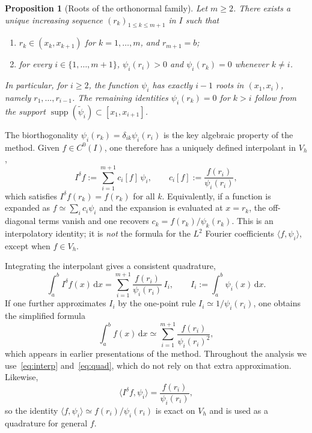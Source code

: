 \documentclass[final,3p,times]{elsarticle}
\theoremstyle{plain}
\newtheorem{proposition}[theorem]{Proposition}
\theoremstyle{definition}
\theoremstyle{remark}
\newcommand{\supp}{\operatorname{supp}}
\newcommand{\dd}{\mathrm{d}}
\begin{document}
\begin{proposition}[Roots of the orthonormal family]
\label{prop:roots}
Let $m\ge 2$. There exists a unique increasing sequence
$(r_k)_{1\le k\le m+1}$ in $I$ such that
\begin{enumerate}
\item $r_k\in(x_k,x_{k+1})$ for $k=1,\dots,m$, and $r_{m+1}=b$;
\item for every $i\in\{1,\dots,m+1\}$,
$\psi_i(r_i)>0$ and $\psi_i(r_k)=0$ whenever $k\neq i$.
\end{enumerate}
In particular, for $i\ge 2$, the function $\psi_i$ has exactly $i-1$ roots in
$(x_1,x_i)$, namely $r_1,\dots,r_{i-1}$. The remaining identities
$\psi_i(r_k)=0$ for $k>i$ follow from the support
$\supp(\widetilde\psi_i)\subset[x_1,x_{i+1}]$.
\end{proposition}

The biorthogonality $\psi_i(r_k)=\delta_{ik}\psi_i(r_i)$ is the key algebraic
property of the method. Given $f\in C^0(I)$, one therefore has a uniquely
defined interpolant in $V_h$,
\begin{equation}
\label{eq:interp}
I^\delta f:=\sum_{i=1}^{m+1}c_i[f]\,\psi_i,
\qquad
c_i[f]:=\frac{f(r_i)}{\psi_i(r_i)},
\end{equation}
which satisfies $I^\delta f(r_k)=f(r_k)$ for all $k$. Equivalently, if a
function is expanded as $f\simeq\sum_i c_i\psi_i$ and the expansion is
evaluated at $x=r_k$, the off-diagonal terms vanish and one recovers
$c_k=f(r_k)/\psi_k(r_k)$. This is an interpolatory identity; it is \emph{not}
the formula for the $L^2$ Fourier coefficients
$\langle f,\psi_i\rangle$, except when $f\in V_h$.

Integrating the interpolant gives a consistent quadrature,
\begin{equation}
\label{eq:quad}
\int_a^b I^\delta f(x)\,\dd x
=\sum_{i=1}^{m+1}\frac{f(r_i)}{\psi_i(r_i)}\,I_i,
\qquad
I_i:=\int_a^b\psi_i(x)\,\dd x.
\end{equation}
If one further approximates $I_i$ by the one-point rule
$I_i\simeq 1/\psi_i(r_i)$, one obtains the simplified formula
\begin{equation}
\label{eq:quad-simple}
\int_a^b f(x)\,\dd x
\simeq\sum_{i=1}^{m+1}\frac{f(r_i)}{\psi_i(r_i)^2},
\end{equation}
which appears in earlier presentations of the method. Throughout the analysis
we use~\eqref{eq:interp} and~\eqref{eq:quad}, which do not rely on that extra
approximation. Likewise,
\begin{equation}
\label{eq:inner-interp}
\langle I^\delta f,\psi_i\rangle
=\frac{f(r_i)}{\psi_i(r_i)},
\end{equation}
so the identity $\langle f,\psi_i\rangle\simeq f(r_i)/\psi_i(r_i)$ is exact on
$V_h$ and is used as a quadrature for general $f$.
\end{document}
